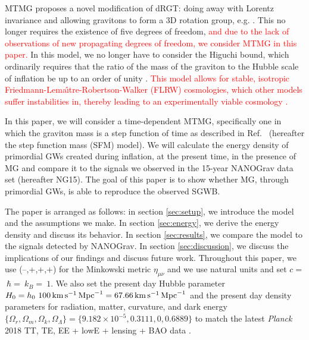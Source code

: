 \documentclass[prd,twocolumn,aps,psfig,nofootinbib,nobibnotes,superscriptaddress,preprintnumbers,times]{revtex4-2}
\def\red{\textcolor{red}}
\newcommand{\s}{\,{\rm s}}
\newcommand{\km}{\,{\rm km}}
\newcommand{\Mpc}{\,{\rm Mpc}}
\begin{document}
MTMG proposes a novel modification of dRGT: doing away with Lorentz invariance and allowing gravitons to form a 3D rotation group, e.g. \cite{Arkani-Hamed:2003pdi, Rubakov:2004eb, Dubovsky:2004sg, Blas:2009my, Rubakov:2008nh, Blas:2007zz, Comelli:2013txa, Langlois:2014jba}. This no longer requires the existence of five degrees of freedom, \red{and due to the lack of observations of new propagating degrees of freedom, we consider MTMG in this paper.} In this model, we no longer have to consider the Higuchi bound, which ordinarily requires that the ratio of the mass of the graviton to the Hubble scale of inflation be up to an order of unity \cite{Higuchi:1986py}. 
\red{This model allows for stable, isotropic Friedmann-Lema\^{\i}tre-Robertson-Walker (FLRW) cosmologies, which other models suffer instabilities in, thereby leading to an experimentally viable cosmology \cite{DeFelice:2015hla}.}

In this paper, we will consider a time-dependent MTMG, specifically one in which the graviton mass is a step function of time as described in Ref.\ \cite{Fujita:2018ehq} (hereafter the step function mass (SFM) model). We will calculate the energy density of primordial GWs created during inflation, at the present time, in the presence of MG and compare it to the signals we observed in the 15-year NANOGrav data set (hereafter NG15). The goal of this paper is to show whether MG, through primordial GWs, is able to reproduce the observed SGWB.

The paper is arranged as follows: in section \ref{sec:setup}, we introduce the model and the assumptions we make. In section \ref{sec:energy}, we derive the energy density and discuss its behavior. In section \ref{sec:results}, we compare the model to the signals detected by NANOGrav. In section \ref{sec:discussion}, we discuss the implications of our findings and discuss future work. Throughout this paper, we use  (--,+,+,+) for the Minkowski metric $\eta_{\mu\nu}$ and we use natural units and set $c = $$\ \hbar = $$\ k_B = $$\ 1$. We also set the present day Hubble parameter $H_0 = h_0\ 100 \km \s^{-1}\Mpc^{-1} = 67.66 \km \s^{-1}\Mpc^{-1}$ and the present day density parameters for radiation, matter, curvature, and dark energy $\{\Omega_r, \Omega_m, \Omega_k, \Omega_\Lambda\} = \{9.182\times10^{-5},0.3111,0,0.6889\}$ to match the latest \textit{Planck} 2018 TT, TE, EE + lowE + lensing + BAO data \cite{Planck:2018vyg}.
\end{document}
